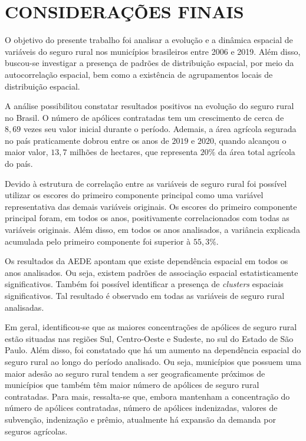 \documentclass[12pt,a4paper]{article}
\begin{document}
\newpage

\section{CONSIDERAÇÕES FINAIS}

O objetivo do presente trabalho foi analisar a evolução e a dinâmica espacial de variáveis do seguro rural nos municípios brasileiros entre 2006 e 2019. Além disso, buscou-se investigar a presença de padrões de distribuição espacial, por meio da autocorrelação espacial, bem como a existência de agrupamentos locais de distribuição espacial.

A análise possibilitou constatar resultados positivos na evolução do seguro rural no Brasil. O número de apólices contratadas tem um crescimento de cerca de $8,69$ vezes seu valor inicial durante o período. Ademais, a área agrícola segurada no país praticamente dobrou entre os anos de $2019$ e $2020$, quando alcançou o maior valor, $13,7$ milhões de hectares, que representa $20\%$ da área total agrícola do país. 

Devido à estrutura de correlação entre as variáveis de seguro rural foi possível utilizar os escores do primeiro componente principal como uma variável representativa das demais variáveis originais. Os escores do primeiro componente principal foram, em todos os anos, positivamente correlacionados com todas as variáveis originais. Além disso, em todos os anos analisados, a variância explicada acumulada pelo primeiro componente foi superior à $55,3\%$. 

Os resultados da AEDE apontam que existe dependência espacial em todos os anos analisados. Ou seja, existem padrões de associação espacial estatisticamente significativos. Também foi possível identificar a presença de \textit{clusters} espaciais significativos. Tal resultado é observado em todas as variáveis de seguro rural analisadas. 

Em geral, identificou-se que as maiores concentrações de apólices de seguro rural estão situadas nas regiões Sul, Centro-Oeste e Sudeste, no sul do Estado de São Paulo. Além disso, foi constatado que há um aumento na dependência espacial do seguro rural ao longo do período analisado. Ou seja, municípios que possuem uma maior adesão ao seguro rural tendem a ser geograficamente próximos de municípios que também têm maior número de apólices de seguro rural contratadas. Para mais, ressalta-se que, embora mantenham a concentração do número de apólices contratadas, número de apólices indenizadas, valores de subvenção, indenização e prêmio, atualmente há expansão da demanda por seguros agrícolas. 
\end{document}
